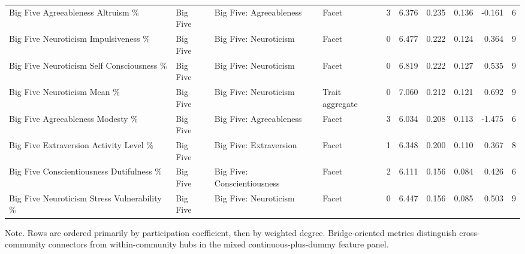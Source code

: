 \begin{table}[htbp]
\begin{threeparttable}
\begin{adjustbox}{max width=\linewidth}
\begin{tabular}{llllrrrrrr}
Big Five Agreeableness Altruism \% & Big Five & Big Five: Agreeableness & Facet & 3 & 6.376 & 0.235 & 0.136 & -0.161 & 6 \\
Big Five Neuroticism Impulsiveness \% & Big Five & Big Five: Neuroticism & Facet & 0 & 6.477 & 0.222 & 0.124 & 0.364 & 9 \\
Big Five Neuroticism Self Consciousness \% & Big Five & Big Five: Neuroticism & Facet & 0 & 6.819 & 0.222 & 0.127 & 0.535 & 9 \\
Big Five Neuroticism Mean \% & Big Five & Big Five: Neuroticism & Trait aggregate & 0 & 7.060 & 0.212 & 0.121 & 0.692 & 9 \\
Big Five Agreeableness Modesty \% & Big Five & Big Five: Agreeableness & Facet & 3 & 6.034 & 0.208 & 0.113 & -1.475 & 6 \\
Big Five Extraversion Activity Level \% & Big Five & Big Five: Extraversion & Facet & 1 & 6.348 & 0.200 & 0.110 & 0.367 & 8 \\
Big Five Conscientiousness Dutifulness \% & Big Five & Big Five: Conscientiousness & Facet & 2 & 6.111 & 0.156 & 0.084 & 0.426 & 6 \\
Big Five Neuroticism Stress Vulnerability \% & Big Five & Big Five: Neuroticism & Facet & 0 & 6.447 & 0.156 & 0.085 & 0.503 & 9 \\
\bottomrule
\end{tabular}
\end{adjustbox}
\begin{tablenotes}[flushleft]
\footnotesize
\item Note. Rows are ordered primarily by participation coefficient, then by weighted degree. Bridge-oriented metrics distinguish cross-community connectors from within-community hubs in the mixed continuous-plus-dummy feature panel.
\end{tablenotes}
\end{threeparttable}
\end{table}